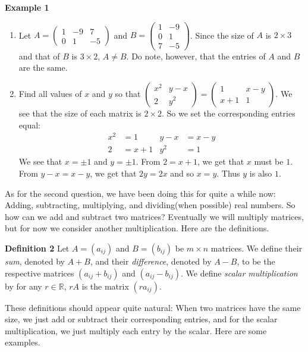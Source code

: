 \documentclass[12pt]{article}
\def\it{\item}
\def\be{\begin{enumerate}} \def\ee{\end{enumerate}}
\def\R{\mathbb{R}} \def\Q{\mathbb{Q}} \def\N{\mathbb{N}} \def\Z{\mathbb{Z}} \def\P{\mathbb{P}}
\begin{document}
\noindent
{\bf Example 1}
\be
\it Let $A = \begin{pmatrix} 1 & -9 & 7 \\ 0 & 1 & -5 \end{pmatrix}$ and $B = \begin{pmatrix} 1 & -9 \\ 0 & 1 \\ 7 & -5 \end{pmatrix}$. Since the size of $A$ is 
$2 \times 3$ and that of $B$ is $3 \times 2$, $A \not= B$. Do note, however, that the entries of $A$ and $B$ are the same.
\it Find all values of $x$ and $y$ so that $\begin{pmatrix} x^2 & y-x \\ 2 & y^2 \end{pmatrix} = \begin{pmatrix} 1 & x-y \\ x+1 & 1 \end{pmatrix}$. We see that the size of each matrix is $2 \times 2$. So we set the corresponding entries equal: 
\begin{align*}
x^2 &= 1 & y-x &= x-y \\
2 &= x+1 & y^2 &= 1
\end{align*}
\noindent
We see that $x = \pm 1$ and $y = \pm 1$. From $2 = x + 1$, we get that $x$ must be $1$. From $y-x = x-y$, we get that $2y = 2x$ and so $x=y$. Thus $y$ is also $1$. 
\ee

As for the second question, we have been doing this for quite a while now: Adding, subtracting, multiplying, and dividing(when possible) real numbers. So how can we add and subtract two matrices? Eventually we will multiply matrices, but for now we consider another multiplication. Here are the definitions.

\noindent
{\bf Definition 2}
Let $A = (a_{ij})$ and $B = (b_{ij})$ be $m \times n$ matrices. We define their {\itshape sum}, denoted by $A + B$, and their {\itshape difference}, denoted by $A - B$, to be the respective matrices $(a_{ij} + b_{ij})$ and $(a_{ij} - b_{ij})$. We define {\itshape scalar multiplication} by for any $r \in \R$, $rA$ is the matrix $(ra_{ij})$. 

These definitions should appear quite natural: When two matrices have the same size, we just add or subtract their corresponding entries, and for the scalar multiplication, we just multiply each entry by the scalar. Here are some examples.
\end{document}

